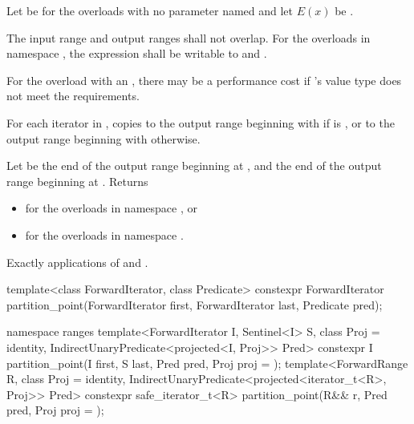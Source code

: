 \begin{itemdescr}
\pnum
Let  be  for the overloads
with no parameter named 
and let $E(x)$ be .

\pnum
\requires
The input range and output ranges shall not overlap.
For the overloads in namespace ,
the expression  shall be
writable to
 and .
\begin{note}
For the overload with an ,
there may be a performance cost if 's value type
does not meet the  requirements.
\end{note}

\pnum
\effects
For each iterator  in , copies  to the output range beginning with  if  is , or to the output range beginning with  otherwise.

\pnum
\returns
Let  be the end of the output range beginning at ,
and  the end of the output range beginning at .
Returns
\begin{itemize}
\item {} for the overloads in namespace , or
\item {} for the overloads in namespace .
\end{itemize}

\pnum
\complexity Exactly  applications of 
and .
\end{itemdescr}

%
\begin{itemdecl}
template<class ForwardIterator, class Predicate>
  constexpr ForwardIterator
    partition_point(ForwardIterator first, ForwardIterator last, Predicate pred);

namespace ranges {
  template<ForwardIterator I, Sentinel<I> S, class Proj = identity,
      IndirectUnaryPredicate<projected<I, Proj>> Pred>
    constexpr I partition_point(I first, S last, Pred pred, Proj proj = {});
  template<ForwardRange R, class Proj = identity,
      IndirectUnaryPredicate<projected<iterator_t<R>, Proj>> Pred>
    constexpr safe_iterator_t<R>
      partition_point(R&& r, Pred pred, Proj proj = {});
}
\end{itemdecl}

